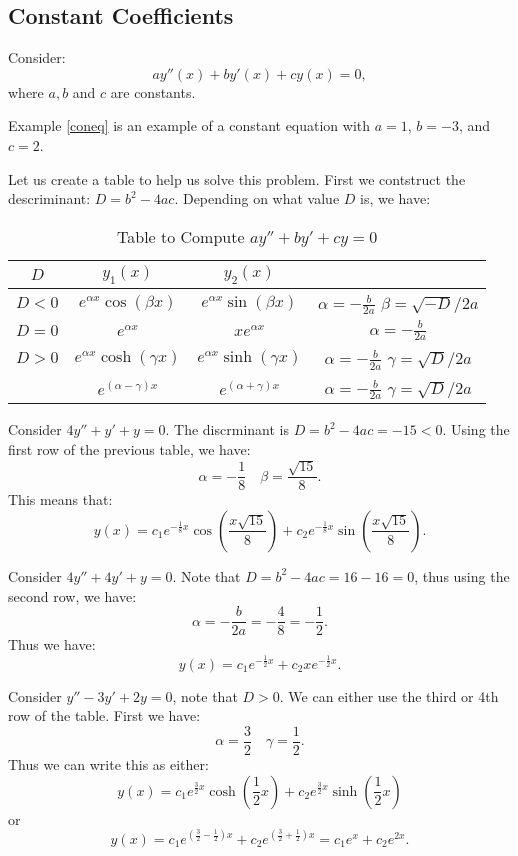 \documentclass[../main/main.tex]{subfiles}
\begin{document}
\subsection{Constant Coefficients}
Consider: \[
	ay''(x)+by'(x)+cy(x)=0
,\] where $a,b$ and  $c$  are constants.
\begin{example}
	Example \ref{coneq} is an example of a constant equation with $a=1$, $b=-3$, and $c=2$.  
\end{example}
Let us create a table to help us solve this problem. First we contstruct the descriminant: $D=b^2-4ac$. Depending on what value $D$ is, we have: 
\begin{table}[htpb]
	\centering
	\caption{Table to Compute $ay''+by'+cy=0$}
	\label{tab:label}
	\begin{tabular}{c|c|c|c}
		$D$ &$y_1(x)$ & $y_2(x)$\\
	\hline
		$D<0$&  $e^{\alpha x}\cos(\beta x)$ & $e^{\alpha x}\sin(\beta x)$ &$\alpha=-\frac{b}{2a}$ $\beta=\sqrt{-D} /2a$\\
	\hline
		$D= 0$&  $e^{\alpha x}$ & $xe^{\alpha x}$ &$\alpha=-\frac{b}{2a}$	\\
	\hline
	$D> 0$&  $e^{\alpha x}\cosh(\gamma x)$ & $e^{\alpha x}\sinh(\gamma x)$ &$\alpha=-\frac{b}{2a}$ $\gamma=\sqrt{D} /2a$\\
	&  $e^{(\alpha-\gamma) x}$ & $e^{(\alpha+\gamma) x}$ &$\alpha=-\frac{b}{2a}$ $\gamma=\sqrt{D} /2a$\\
	\end{tabular}
\end{table}

\begin{example}
	Consider $4y''+y'+y=0$. The discrminant is $D=b^2-4ac=-15<0$. Using the first row of the previous table, we have: \[
		\alpha = -\frac{1}{8}\quad \beta=\frac{\sqrt{15}}{8}
	.\] This means that: \[
	y(x) = c_1e^{-\frac{1}{8}x}\cos\left( \frac{x\sqrt{15} }{8} \right) +c_2e^{-\frac{1}{8}x}\sin\left( \frac{x\sqrt{15} }{8} \right) 
	.\] 
\end{example}
\begin{example}
	Consider $4y''+4y'+y=0$. Note that  $D=b^2-4ac=16-16=0$, thus using the second row, we have: \[
	\alpha=-\frac{b}{2a}=-\frac{4}{8}=-\frac{1}{2}
	.\] Thus we have: \[
	y(x) = c_1e^{-\frac{1}{2}x}+c_2xe^{-\frac{1}{2}x}
	.\] 
\end{example}
\begin{example}
	Consider $y''-3y'+2y=0$, note that  $D>0$. We can either use the third or 4th row of the table. First we have: \[
	\alpha= \frac{3}{2}\quad \gamma=\frac{1}{2}
	.\] Thus we can write this as either: \[
	y(x) = c_1 e^{\frac{3}{2}x}\cosh(\frac{1}{2}x)+c_2e^{\frac{3}{2}x}\sinh(\frac{1}{2}x)
	\] or \[
	y(x) = c_1e^{(\frac{3}{2}-\frac{1}{2})x}+c_2e^{(\frac{3}{2}+\frac{1}{2})x} = c_1e^{x}+c_2e^{2x}
	.\]  
\end{example}
\end{document}
